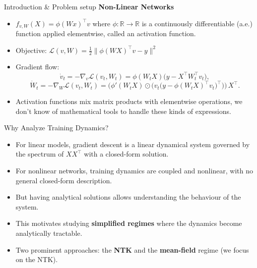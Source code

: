 \documentclass[10pt,aspectratio=169]{beamer}
\begin{document}
\begin{frame}{Introduction \& Problem setup}
	\textbf{Non-Linear Networks}
	\begin{itemize}
		\item $f_{v,W}(X) = \phi(Wx)^\top v$ where $\phi: \mathbb{R}\to \mathbb{R}$ is a continuously differentiable (a.e.)
		      function applied elementwise, called an activation function.
		\item Objective: $\mathcal{L}(v,W) = \frac{1}{2} \|\phi(WX)^\top v - y\|^2$
		      \pause
		\item Gradient flow:
		      \[
			      \dot v_t = -\nabla_v \mathcal{L}(v_t,W_t)
			      = \phi(W_t X) \bigl(y - X^\top W_t^\top v_t\bigr),
		      \]
		      \pause
		      \[
			      \dot W_t
			      = -\nabla_W \mathcal{L}(v_t,W_t)
			      = \Big(\phi'(W_t X) \odot \big(v_t \bigl(y - \phi(W_t X)^\top v_t\bigr)^\top\big)\Big)\,X^\top.
		      \]
		      \pause
		\item Activation functions mix matrix products with elementwise
		      operations, we don't know of mathematical tools to handle these kinds of expressions.
	\end{itemize}
\end{frame}

\begin{frame}{Why Analyze Training Dynamics?}
	\begin{itemize}
		\item For linear models, gradient descent is a linear dynamical system governed by the spectrum of $XX^\top$
		      with a closed-form solution.
		      \pause
		\item For nonlinear networks, training dynamics are coupled and nonlinear, with no general closed-form description.
		      \pause
		\item But having analytical solutions allows understanding the behaviour of the system.
		      \pause
		\item This motivates studying \textbf{simplified regimes} where the dynamics become analytically tractable.
		      \pause
		\item Two prominent approaches: the \textbf{NTK} and the \textbf{mean-field} regime (we focus on the NTK).
	\end{itemize}
\end{frame}
\end{document}
